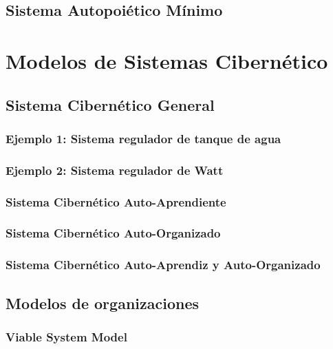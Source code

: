 \subsection{Sistema Autopoiético Mínimo}
\section{Modelos de Sistemas Cibernético}

\subsection{Sistema Cibernético General}
\subsubsection{Ejemplo 1: Sistema regulador de tanque de agua}
\subsubsection{Ejemplo 2: Sistema regulador de Watt}
\subsubsection{Sistema Cibernético Auto-Aprendiente}
\subsubsection{Sistema Cibernético Auto-Organizado}
\subsubsection{Sistema Cibernético Auto-Aprendiz y Auto-Organizado}

\subsection{Modelos de organizaciones}
\subsubsection{Viable System Model}
